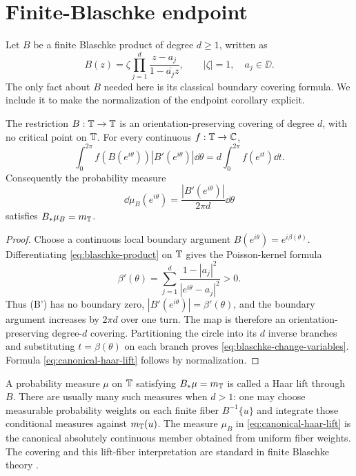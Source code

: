 \section{Finite-Blaschke endpoint}\label{sec:blaschke-endpoint}

Let \(B\) be a finite Blaschke product of degree \(d\geq1\), written as
\begin{equation}\label{eq:blaschke-product}
 B(z)=\zeta\prod_{j=1}^{d}
 \frac{z-a_j}{1-\overline{a_j}z},
 \qquad |\zeta|=1,\quad a_j\in\DD.
\end{equation}
The only fact about \(B\) needed here is its classical boundary covering
formula.  We include it to make the normalization of the endpoint
corollary explicit.

\begin{lemma}\label{lem:blaschke-covering}
The restriction \(B:\mathbb{T}\to\mathbb{T}\) is an orientation-preserving covering
of degree \(d\), with no critical point on \(\mathbb{T}\).  For every continuous
\(f:\mathbb{T}\to\mathbb{C}\),
\begin{equation}\label{eq:blaschke-change-variables}
 \int_0^{2\pi}f(B(e^{i\theta}))|B'(e^{i\theta})|\dd\theta
 =d\int_0^{2\pi}f(e^{it})\dd t.
\end{equation}
Consequently the probability measure
\begin{equation}\label{eq:canonical-haar-lift}
 \dd\mu_B(e^{i\theta})
 =\frac{|B'(e^{i\theta})|}{2\pi d}\dd\theta
\end{equation}
satisfies \(B_\ast\mu_B=m_{\mathbb{T}}\).
\end{lemma}

\begin{proof}
Choose a continuous local boundary argument
\(B(e^{i\theta})=e^{i\beta(\theta)}\).  Differentiating
\eqref{eq:blaschke-product} on \(\mathbb{T}\) gives the Poisson-kernel formula
\[
 \beta'(\theta)
 =\sum_{j=1}^{d}
 \frac{1-|a_j|^2}{|e^{i\theta}-a_j|^2}>0.
\]
Thus (B') has no boundary zero,
\(|B'(e^{i\theta})|=\beta'(\theta)\), and the boundary argument
increases by \(2\pi d\) over one turn.  The map is therefore an
orientation-preserving degree-\(d\) covering.  Partitioning the circle
into its \(d\) inverse branches and substituting
\(t=\beta(\theta)\) on each branch proves
\eqref{eq:blaschke-change-variables}.  Formula
\eqref{eq:canonical-haar-lift} follows by normalization.
\end{proof}

A probability measure \(\mu\) on \(\mathbb{T}\) satisfying
\(B_\ast\mu=m_{\mathbb{T}}\) is called a Haar lift through \(B\).  There are
usually many such measures when \(d>1\): one may choose measurable
probability weights on each finite fiber \(B^{-1}\{u\}\) and integrate
those conditional measures against \(m_{\mathbb{T}}(u)\).  The measure
\(\mu_B\) in \eqref{eq:canonical-haar-lift} is the canonical
absolutely continuous member obtained from uniform fiber weights.  The
covering and this lift-fiber interpretation are standard in finite
Blaschke theory \citep{GarciaMashreghiRoss2018}.

